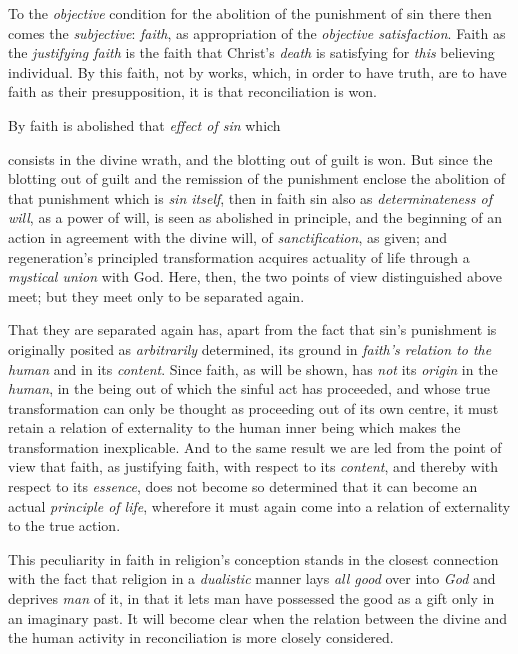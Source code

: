 \documentclass[12pt,a4paper]{book}
\begin{document}
To the \emph{objective} condition for the abolition of the punishment of sin
there then comes the \emph{subjective}: \emph{faith}, as appropriation of the
\emph{objective satisfaction}. Faith as the \emph{justifying faith} is the faith
that Christ's \emph{death} is satisfying for \emph{this} believing individual.
By this faith, not by works, which, in order to have truth, are to have faith as
their presupposition, it is that reconciliation is won.

By faith is abolished that \emph{effect of sin} which

consists in the divine wrath, and the blotting out of guilt is won. But since
the blotting out of guilt and the remission of the punishment enclose the
abolition of that punishment which is \emph{sin itself}, then in faith sin also
as \emph{determinateness of will}, as a power of will, is seen as abolished in
principle, and the beginning of an action in agreement with the divine will, of
\emph{sanctification}, as given; and regeneration's principled transformation
acquires actuality of life through a \emph{mystical union} with God. Here, then,
the two points of view distinguished above meet; but they meet only to be
separated again.

That they are separated again has, apart from the fact that sin's punishment is
originally posited as \emph{arbitrarily} determined, its ground in \emph{faith's
relation to the human} and in its \emph{content}. Since faith, as will be shown,
has \emph{not} its \emph{origin} in the \emph{human}, in the being out of which
the sinful act has proceeded, and whose true transformation can only be thought
as proceeding out of its own centre, it must retain a relation of externality to
the human inner being which makes the transformation inexplicable. And to the
same result we are led from the point of view that faith, as justifying faith,
with respect to its \emph{content}, and thereby with respect to its
\emph{essence}, does not become so determined that it can become an actual
\emph{principle of life}, wherefore it must again come into a relation of
externality to the true action.

This peculiarity in faith in religion's conception stands in the closest
connection with the fact that religion in a \emph{dualistic} manner lays
\emph{all good} over into \emph{God} and deprives \emph{man} of it, in that it
lets man have possessed the good as a gift only in an imaginary past. It will
become clear when the relation between the divine and the human activity in
reconciliation is more closely considered.
\end{document}
